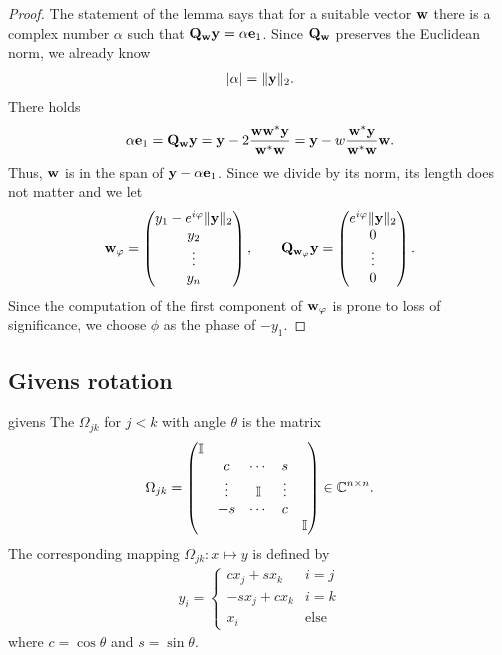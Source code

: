 \begin{proof}
  The statement of the lemma says that for a suitable vector $\mathbf w$ there is a complex number
  $\alpha$ such that $\mathbf Q_{\mathbf w} \mathbf y = \alpha \mathbf e_1$. Since
  $\mathbf Q_{\mathbf w}$ preserves the Euclidean norm, we already know
  \begin{gather}
    \lvert\alpha\rvert = \lVert\mathbf y\rVert_2.
  \end{gather}
  There holds
  \begin{gather}
    \alpha\mathbf e_1 = \mathbf Q_{\mathbf w} \mathbf y
    = \mathbf y - 2 \frac{\mathbf w\mathbf w^*\mathbf y}{\mathbf w^*\mathbf w}
    = \mathbf y - w \frac{\mathbf w^*\mathbf y}{\mathbf w^*\mathbf w}\mathbf w.
  \end{gather}
  Thus, $\mathbf w$ is in the span of $\mathbf y-\alpha \mathbf e_1$. Since we divide by
  its norm, its length does not matter and we let
  \begin{gather}
    \mathbf w_\varphi =
    \begin{pmatrix}
      y_1 - e^{i\varphi} \lVert\mathbf y\rVert_2\\y_2\\\vdots\\y_n
    \end{pmatrix},
    \qquad
    \mathbf Q_{\mathbf w_\varphi}\mathbf y =
    \begin{pmatrix}
      e^{i\varphi} \lVert\mathbf y\rVert_2\\0\\\vdots\\0
    \end{pmatrix}.
  \end{gather}
  Since the computation of the first component of $\mathbf w_\varphi$ is prone to loss of significance, we choose $\phi$ as the phase of $-y_1$.
\end{proof}

\subsection{Givens rotation}

\begin{Definition}{givens}
  The  $\Omega_{jk}$ for $j<k$ with angle $\theta$ is the matrix
  \begin{gather}
      \Omega_{jk} =
    \begin{pmatrix}
      \mathbb I \\
      &c&\cdots&s\\
      &\vdots&\mathbb I &\vdots\\
      &-s&\cdots&c\\
      &&&&\mathbb I
    \end{pmatrix}
    \in\mathbb C^{n\times n}.
  \end{gather}
  The corresponding mapping $\Omega_{jk}\colon x\mapsto y$ is defined by
  \begin{gather}
    y_i =
    \begin{cases}
      c x_j + s x_k & i=j\\
      -s x_j + c x_k & i=k\\
      x_i &\text{else}
    \end{cases}
  \end{gather}
  where $c = \cos\theta$ and $s = \sin\theta$.
\end{Definition}

